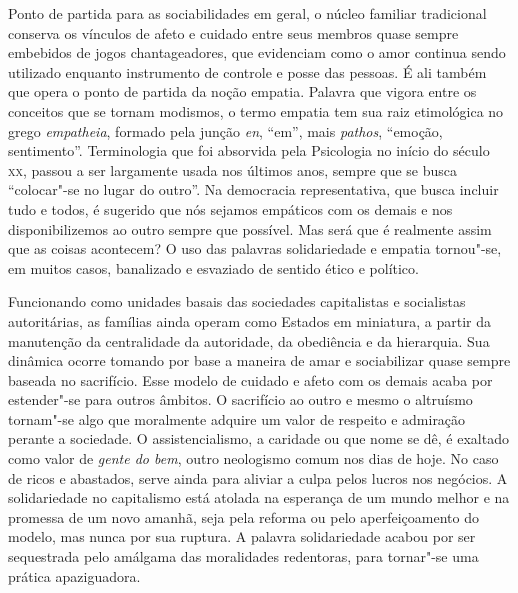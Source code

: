 Ponto de partida para as sociabilidades em geral, o núcleo familiar
tradicional conserva os vínculos de afeto e cuidado entre seus membros
quase sempre embebidos de jogos chantageadores, que evidenciam como o
amor continua sendo utilizado enquanto instrumento de controle e posse
das pessoas. É ali também que opera o ponto de partida da noção empatia.
Palavra que vigora entre os conceitos que se tornam modismos, o termo
empatia tem sua raiz etimológica no grego \emph{empatheia}, formado pela
junção \emph{en}, ``em'', mais \emph{pathos}, ``emoção, sentimento''.
Terminologia que foi absorvida pela Psicologia no início do século \textsc{xx},
passou a ser largamente usada nos últimos anos, sempre que se busca
``colocar"-se no lugar do outro''. Na democracia representativa, que
busca incluir tudo e todos, é sugerido que nós sejamos empáticos com os
demais e nos disponibilizemos ao outro sempre que possível. Mas será que
é realmente assim que as coisas acontecem? O uso das palavras
solidariedade e empatia tornou"-se, em muitos casos, banalizado e
esvaziado de sentido ético e político.

Funcionando como unidades basais das sociedades capitalistas e
socialistas autoritárias, as famílias ainda operam como Estados em
miniatura, a partir da manutenção da centralidade da autoridade, da
obediência e da hierarquia. Sua dinâmica ocorre tomando por base a
maneira de amar e sociabilizar quase sempre baseada no sacrifício. Esse
modelo de cuidado e afeto com os demais acaba por estender"-se para
outros âmbitos. O sacrifício ao outro e mesmo o altruísmo tornam"-se algo
que moralmente adquire um valor de respeito e admiração perante a
sociedade. O assistencialismo, a caridade ou que nome se dê, é exaltado
como valor de \emph{gente do bem}, outro neologismo comum nos dias de
hoje. No caso de ricos e abastados, serve ainda para aliviar a culpa
pelos lucros nos negócios. A solidariedade no capitalismo está atolada
na esperança de um mundo melhor e na promessa de um novo amanhã, seja
pela reforma ou pelo aperfeiçoamento do modelo, mas nunca por sua
ruptura. A palavra solidariedade acabou por ser sequestrada pelo
amálgama das moralidades redentoras, para tornar"-se uma prática
apaziguadora.

